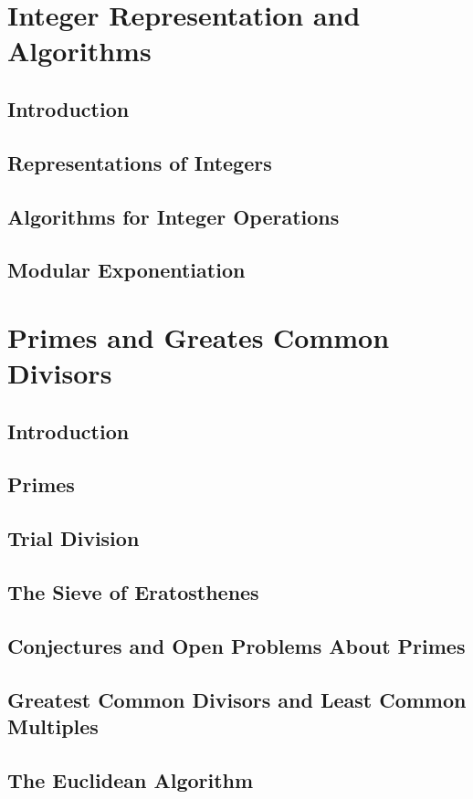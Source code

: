 \documentclass[11pt]{book}
\begin{document}
 \section{Integer Representation and Algorithms}
  \subsection{Introduction}
  \subsection{Representations of Integers}
  \subsection{Algorithms for Integer Operations}
  \subsection{Modular Exponentiation}
  
 \section{Primes and Greates Common Divisors}
  \subsection{Introduction}
  \subsection{Primes}
  \subsection{Trial Division}
  \subsection{The Sieve of Eratosthenes}
  \subsection{Conjectures and Open Problems About Primes}
  \subsection{Greatest Common Divisors and Least Common Multiples}
  \subsection{The Euclidean Algorithm}
  
\end{document}
